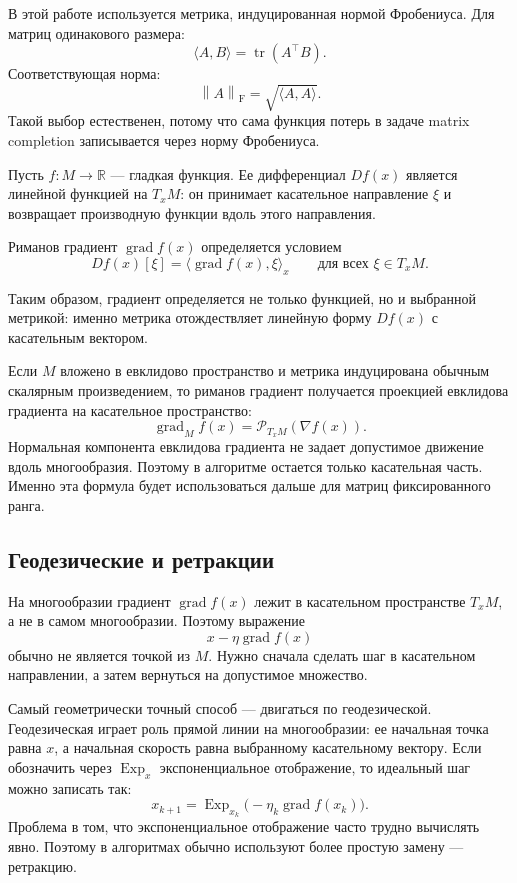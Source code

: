 \documentclass[a4paper,12pt]{article}
\newcommand{\R}{\mathbb{R}}
\newcommand{\fro}[1]{\left\lVert #1 \right\rVert_{\mathrm F}}
\newcommand{\tr}{\operatorname{tr}}
\newcommand{\grad}{\operatorname{grad}}
\renewcommand{\Proj}{\mathcal{P}}
\begin{document}
В этой работе используется метрика, индуцированная нормой Фробениуса. Для матриц одинакового размера:
\[
\langle A,B\rangle=\tr(A^\top B).
\]
Соответствующая норма:
\[
\fro{A}=\sqrt{\langle A,A\rangle}.
\]
Такой выбор естественен, потому что сама функция потерь в задаче matrix completion записывается через норму Фробениуса.

Пусть $f:M\to\R$ --- гладкая функция. Ее дифференциал $Df(x)$ является линейной функцией на $T_xM$: он принимает касательное направление $\xi$ и возвращает производную функции вдоль этого направления.

\begin{definition}
Риманов градиент $\grad f(x)$ определяется условием
\[
Df(x)[\xi]=\langle \grad f(x),\xi\rangle_x
\qquad \text{для всех }\xi\in T_xM.
\]
\end{definition}

Таким образом, градиент определяется не только функцией, но и выбранной метрикой: именно метрика отождествляет линейную форму $Df(x)$ с касательным вектором.

Если $M$ вложено в евклидово пространство и метрика индуцирована обычным скалярным произведением, то риманов градиент получается проекцией евклидова градиента на касательное пространство:
\[
\grad_M f(x)=\Proj_{T_xM}(\nabla f(x)).
\]
Нормальная компонента евклидова градиента не задает допустимое движение вдоль многообразия. Поэтому в алгоритме остается только касательная часть. Именно эта формула будет использоваться дальше для матриц фиксированного ранга.

\subsection{Геодезические и ретракции}

На многообразии градиент $\grad f(x)$ лежит в касательном пространстве $T_xM$, а не в самом многообразии. Поэтому выражение
\[
x-\eta \grad f(x)
\]
обычно не является точкой из $M$. Нужно сначала сделать шаг в касательном направлении, а затем вернуться на допустимое множество.

Самый геометрически точный способ --- двигаться по геодезической. Геодезическая играет роль прямой линии на многообразии: ее начальная точка равна $x$, а начальная скорость равна выбранному касательному вектору. Если обозначить через $\operatorname{Exp}_x$ экспоненциальное отображение, то идеальный шаг можно записать так:
\[
x_{k+1}=\operatorname{Exp}_{x_k}\bigl(-\eta_k\grad f(x_k)\bigr).
\]
Проблема в том, что экспоненциальное отображение часто трудно вычислять явно. Поэтому в алгоритмах обычно используют более простую замену --- ретракцию.
\end{document}
